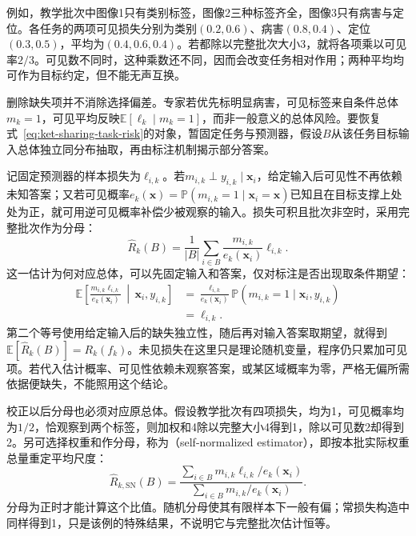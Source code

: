 例如，教学批次中图像1只有类别标签，图像2三种标签齐全，图像3只有病害与定位。各任务的两项可见损失分别为类别$(0.2,0.6)$、病害$(0.8,0.4)$、定位$(0.3,0.5)$，平均为$(0.4,0.6,0.4)$。若都除以完整批次大小3，就将各项乘以可见率$2/3$。可见数不同时，这种乘数还不同，因而会改变任务相对作用；两种平均均可作为目标约定，但不能无声互换。

删除缺失项并不消除选择偏差。专家若优先标明显病害，可见标签来自条件总体$m_k=1$，可见平均反映$\mathbb E[\ell_k\mid m_k=1]$，而非一般意义的总体风险。要恢复式~\eqref{eq:ket-sharing-task-risk}的对象，暂固定任务与预测器，假设$B$从该任务目标输入总体独立同分布抽取，再由标注机制揭示部分答案。

记固定预测器的样本损失为$\ell_{i,k}$。若$m_{i,k}\perp y_{i,k}\mid\bm x_i$，给定输入后可见性不再依赖未知答案；又若可见概率$e_k(\bm x)=\mathbb P(m_{i,k}=1\mid\bm x_i=\bm x)$已知且在目标支撑上处处为正，就可用逆可见概率补偿少被观察的输入。损失可积且批次非空时，采用完整批次作为分母：
\begin{equation}
  \widehat R_k(B)=\frac{1}{|B|}
    \sum_{i\in B}\frac{m_{i,k}}{e_k(\bm x_i)}\ell_{i,k}.
  \label{eq:ket-sharing-label-ipw}
\end{equation}
这一估计为何对应总体，可以先固定输入和答案，仅对标注是否出现取条件期望：
\begin{align}
  \mathbb E\!\left[
    \frac{m_{i,k}\ell_{i,k}}{e_k(\bm x_i)}
    \,\middle|\,\bm x_i,y_{i,k}\right]
  &=\frac{\ell_{i,k}}{e_k(\bm x_i)}
    \mathbb P(m_{i,k}=1\mid\bm x_i,y_{i,k})
  \nonumber\\
  &=\ell_{i,k}.
  \label{eq:ket-sharing-label-ipw-expectation}
\end{align}
第二个等号使用给定输入后的缺失独立性，随后再对输入答案取期望，就得到$\mathbb E[\widehat R_k(B)]=R_k(f_k)$。未见损失在这里只是理论随机变量，程序仍只累加可见项。若代入估计概率、可见性依赖未观察答案，或某区域概率为零，严格无偏所需依据便缺失，不能照用这个结论。

校正以后分母也必须对应原总体。假设教学批次有四项损失，均为1，可见概率均为$1/2$，恰观察到两个标签，则加权和4除以完整大小4得到1，除以可见数2却得到2。另可选择权重和作分母，称为（self-normalized estimator），即按本批实际权重总量重定平均尺度：
\begin{equation}
  \widehat R_{k,\mathrm{SN}}(B)
  =\frac{\sum_{i\in B}m_{i,k}\ell_{i,k}/e_k(\bm x_i)}
    {\sum_{i\in B}m_{i,k}/e_k(\bm x_i)}.
  \label{eq:ket-sharing-label-self-normalized}
\end{equation}
分母为正时才能计算这个比值。随机分母使其有限样本下一般有偏；常损失构造中同样得到1，只是该例的特殊结果，不说明它与完整批次估计恒等。

